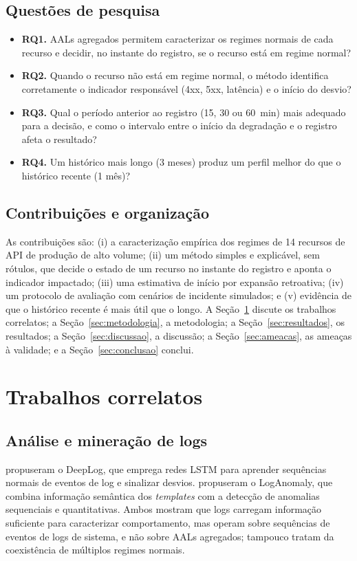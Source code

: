 \documentclass[sigconf,nonacm]{acmart}
\begin{document}
\subsection{Questões de pesquisa}
\begin{itemize}
  \item \textbf{RQ1.} AALs agregados permitem caracterizar os regimes normais de cada recurso e decidir, no instante do registro, se o recurso está em regime normal?
  \item \textbf{RQ2.} Quando o recurso não está em regime normal, o método identifica corretamente o indicador responsável (4xx, 5xx, latência) e o início do desvio?
  \item \textbf{RQ3.} Qual o período anterior ao registro (15, 30 ou 60~min) mais adequado para a decisão, e como o intervalo entre o início da degradação e o registro afeta o resultado?
  \item \textbf{RQ4.} Um histórico mais longo (3 meses) produz um perfil melhor do que o histórico recente (1 mês)?
\end{itemize}

\subsection{Contribuições e organização}
As contribuições são: (i) a caracterização empírica dos regimes de 14 recursos de API de produção de alto volume; (ii) um método simples e explicável, sem rótulos, que decide o estado de um recurso no instante do registro e aponta o indicador impactado; (iii) uma estimativa de início por expansão retroativa; (iv) um protocolo de avaliação com cenários de incidente simulados; e (v) evidência de que o histórico recente é mais útil que o longo. A Seção~\ref{sec:correlatos} discute os trabalhos correlatos; a Seção~\ref{sec:metodologia}, a metodologia; a Seção~\ref{sec:resultados}, os resultados; a Seção~\ref{sec:discussao}, a discussão; a Seção~\ref{sec:ameacas}, as ameaças à validade; e a Seção~\ref{sec:conclusao} conclui.

\section{Trabalhos correlatos}\label{sec:correlatos}

\subsection{Análise e mineração de logs}
\citet{du2017deeplog} propuseram o DeepLog, que emprega redes LSTM para aprender sequências normais de eventos de log e sinalizar desvios. \citet{meng2019loganomaly} propuseram o LogAnomaly, que combina informação semântica dos \emph{templates} com a detecção de anomalias sequenciais e quantitativas. Ambos mostram que logs carregam informação suficiente para caracterizar comportamento, mas operam sobre sequências de eventos de logs de sistema, e não sobre AALs agregados; tampouco tratam da coexistência de múltiplos regimes normais.
\end{document}
